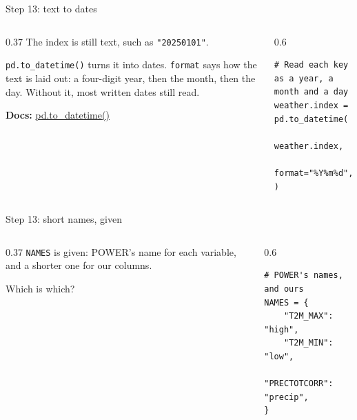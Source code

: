 \documentclass[9pt,aspectratio=169]{beamer}
\begin{document}
\begin{frame}[fragile]{Step 13: text to dates}
    \begin{columns}[T]
        \begin{column}{0.37\textwidth}
            The index is still text, such as \texttt{"20250101"}.

            \medskip
            \texttt{pd.to\_datetime()} turns it into dates. \texttt{format} says how the text is laid out: a four-digit year, then the month, then the day. Without it, most written dates still read.

            \medskip
            {\scriptsize\textbf{Docs:} \href{https://pandas.pydata.org/docs/reference/api/pandas.to_datetime.html}{pd.to\_datetime()}\par}
        \end{column}
        \begin{column}{0.6\textwidth}
\begin{lstlisting}
# Read each key as a year, a month and a day
weather.index = pd.to_datetime(
    weather.index,
    format="%Y%m%d",
)
\end{lstlisting}
        \end{column}
    \end{columns}
\end{frame}

\begin{frame}[fragile]{Step 13: short names, given}
    \begin{columns}[T]
        \begin{column}{0.37\textwidth}
            \texttt{NAMES} is given: POWER's name for each variable, and a shorter one for our columns.

            \medskip
            Which is which?
        \end{column}
        \begin{column}{0.6\textwidth}
\begin{lstlisting}
# POWER's names, and ours
NAMES = {
    "T2M_MAX": "high",
    "T2M_MIN": "low",
    "PRECTOTCORR": "precip",
}
\end{lstlisting}
        \end{column}
    \end{columns}
\end{frame}
\end{document}
